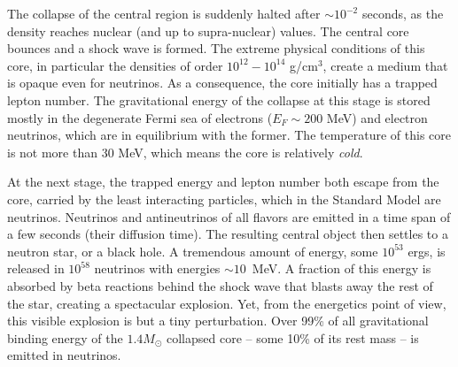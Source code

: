 The collapse of the central region is suddenly halted after $\sim 10^{-2}$ seconds, as the density reaches nuclear (and up to supra-nuclear)  values. The central core bounces and a shock wave is formed. The extreme physical conditions of this core, in particular the densities of order $10^{12}-10^{14}$ g/cm$^{3}$, create a medium that is opaque even for neutrinos. As a consequence, the core initially has a trapped lepton number. The gravitational energy of the collapse at this stage is stored mostly in the degenerate Fermi sea of electrons ($E_{F}\sim 200$ MeV) and electron neutrinos, which are in equilibrium with the former. The temperature of this core is not more than 30 MeV, which means the core is relatively \emph{cold}. 

At the next stage, the trapped energy and lepton number both escape from the core, carried by the least interacting particles, which in the Standard Model are neutrinos.  Neutrinos and antineutrinos of all flavors are emitted in a time span of a few seconds (their diffusion time). The resulting central object then settles to a neutron star, or a black hole. A tremendous amount of energy, some $10^{53}$ ergs, is released in $10^{58}$ neutrinos with energies $\sim 10$~MeV. A fraction of this energy is absorbed by beta reactions behind the shock wave that blasts away the rest of the star, creating a spectacular explosion.
Yet, from the energetics point of view, this visible explosion is but a tiny perturbation. Over 99\% of all gravitational binding energy of the $1.4 M_{\odot}$ collapsed core -- some 10\% of its rest mass -- is emitted in neutrinos. %





